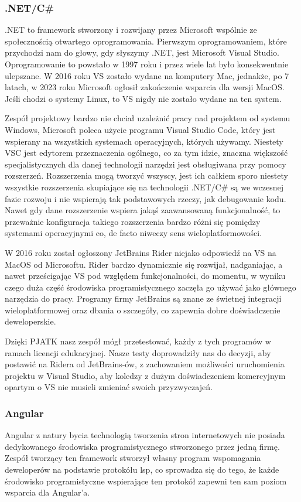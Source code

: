\subsubsection{.NET/C\#}
.NET to framework stworzony i rozwijany przez Microsoft wspólnie ze społecznością otwartego oprogramowania.
Pierwszym oprogramowaniem, które przychodzi nam do głowy, gdy słyszymy .NET, jest Microsoft Visual Studio.
Oprogramowanie to powstało w 1997 roku i przez wiele lat było konsekwentnie ulepszane.
W 2016 roku VS zostało wydane na komputery Mac, jednakże, po 7 latach, w 2023 roku Microsoft ogłosił zakończenie wsparcia dla wersji MacOS.
Jeśli chodzi o systemy Linux, to VS nigdy nie zostało wydane na ten system.

Zespół projektowy bardzo nie chciał uzależnić pracy nad projektem od systemu Windows, Microsoft poleca użycie programu Visual Studio Code, który jest wspierany na wszystkich systemach operacyjnych, których używamy.
Niestety VSC jest edytorem przeznaczenia ogólnego, co za tym idzie, znaczna większość specjalistycznych dla danej technologii narzędzi jest obsługiwana przy pomocy rozszerzeń.
Rozszerzenia mogą tworzyć wszyscy, jest ich całkiem sporo niestety wszystkie rozszerzenia skupiające się na technologii .NET/C\# są we wczesnej fazie rozwoju i nie wspierają tak podstawowych rzeczy, jak debugowanie kodu.
Nawet gdy dane rozszerzenie wspiera jakąś zaawansowaną funkcjonalność, to przeważnie konfiguracja takiego rozszerzenia bardzo różni się pomiędzy systemami operacyjnymi co, de facto niweczy sens wieloplatformowości.

W 2016 roku został ogłoszony JetBrains Rider niejako odpowiedź na VS na MacOS od Microsoftu.
Rider bardzo dynamicznie się rozwijał, nadganiając, a nawet prześcigając VS pod względem funkcjonalności, do momentu, w wyniku czego duża część środowiska programistycznego zaczęła go używać jako głównego narzędzia do pracy.
Programy firmy JetBrains są znane ze świetnej integracji wieloplatformowej oraz dbania o szczegóły, co zapewnia dobre doświadczenie deweloperskie.

Dzięki PJATK nasz zespół mógł przetestować, każdy z tych programów w ramach licencji edukacyjnej.
Nasze testy doprowadziły nas do decyzji, aby postawić na Ridera od JetBrains-ów, z zachowaniem możliwości uruchomienia projektu w Visual Studio, aby koledzy z dużym doświadczeniem komercyjnym opartym o VS nie musieli zmieniać swoich przyzwyczajeń.

\subsubsection{Angular}
Angular z natury bycia technologią tworzenia stron internetowych nie posiada dedykowanego środowiska programistycznego stworzonego przez jedną firmę.
Zespół tworzący ten framework stworzył własny program wspomagania deweloperów na podstawie protokółu \acrshort{lsp}, co sprowadza się do tego, że każde środowisko programistyczne wspierające ten protokół zapewni ten sam poziom wsparcia dla Angular'a.

